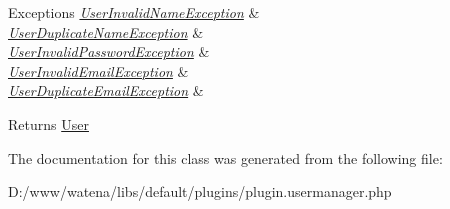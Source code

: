 \begin{DoxyExceptions}{Exceptions}
{\em \hyperlink{class_user_invalid_name_exception}{User\-Invalid\-Name\-Exception}} & \\
\hline
{\em \hyperlink{class_user_duplicate_name_exception}{User\-Duplicate\-Name\-Exception}} & \\
\hline
{\em \hyperlink{class_user_invalid_password_exception}{User\-Invalid\-Password\-Exception}} & \\
\hline
{\em \hyperlink{class_user_invalid_email_exception}{User\-Invalid\-Email\-Exception}} & \\
\hline
{\em \hyperlink{class_user_duplicate_email_exception}{User\-Duplicate\-Email\-Exception}} & \\
\hline
\end{DoxyExceptions}
\begin{DoxyReturn}{Returns}
\hyperlink{class_user}{User} 
\end{DoxyReturn}


The documentation for this class was generated from the following file\-:\begin{DoxyCompactItemize}
\item 
D\-:/www/watena/libs/default/plugins/plugin.\-usermanager.\-php\end{DoxyCompactItemize}
